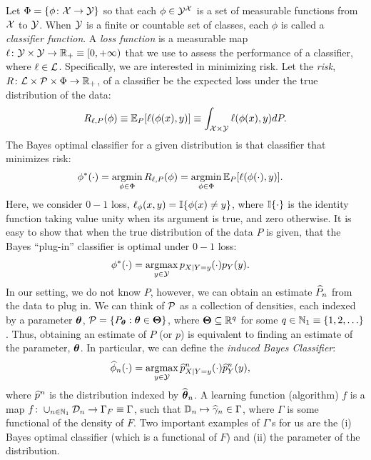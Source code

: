 \documentclass[10pt]{article}
\begin{document}
Let $\Phi=\{\phi {\ensuremath{\colon}} \mathcal{X} \to \mathcal{Y}\}$ so that each $\phi \in \mathcal{Y}^{\mathcal{X}}$ is a set of measurable functions from $\mathcal{X}$ to $\mathcal{Y}$. When $\mathcal{Y}$ is a finite or countable set of classes, each $\phi$ is called a \emph{classifier function}.  
A \emph{loss function} is a measurable map $\ell {\ensuremath{\colon}}  \mathcal{Y} \times \mathcal{Y} \to \mathbb{R}_+ \equiv [0,+\infty)$ that we use to assess the performance of a classifier, where $\ell \in \mathcal{L}$.  Specifically, we are interested in minimizing risk.
Let the \emph{risk}, $R {\colon} \mathcal{L} \times \mathcal{P} \times \Phi \to \mathbb{R}_+$, of a classifier be the expected loss under the true distribution of the data:
\begin{align}
	R_{\ell,P}(\phi) \equiv \mathbb{E}_P[\ell(\phi(x),y)] \equiv  \int_{\mathcal{X} \times \mathcal{Y}} \ell(\phi(x),y) dP.
\end{align}
The Bayes optimal classifier for a given distribution is that classifier that minimizes risk:
\begin{align}
	\phi^*(\cdot) &= \argmin_{\phi \in \Phi} R_{\ell,P}(\phi)= \argmin_{\phi \in \Phi} \EE_P[\ell(\phi(\cdot),y)].
\end{align}
Here, we consider $0-1$ loss, $\ell_\phi(x,y)=\mathbb{I}\{\phi(x) \neq y\}$, where $\mathbb{I}\{\cdot\}$ is the identity function taking value unity when its argument is true, and zero otherwise.  It is easy to show that when the true distribution of the data $P$  is given, that the Bayes ``plug-in'' classifier is optimal under $0-1$ loss:
\begin{align} 
	\phi^*(\cdot)&= \argmax_{y \in \mc{Y}} p_{X|Y=y}(\cdot) p_Y(y).
\end{align}
In our setting, we do not know $P$, however, we can obtain an estimate $\widehat{P}_n$ from the data to plug in.  We can think of $\mathcal{P}$ as a collection of densities, each indexed by a  parameter $\boldsymbol{\theta}$, $\mathcal{P}=\{P_{\boldsymbol{\theta}} : \boldsymbol{\theta} \in \boldsymbol{\Theta}\}$, where $\boldsymbol{\Theta} \subseteq \mathbb{R}^q$ for some $q \in \mathbb{N}_1 \equiv \{1,2,\ldots\}$. Thus, obtaining an estimate of $P$ (or $p$) is equivalent to finding an estimate of the parameter, $\boldsymbol{\theta}$.  In particular, we can define the \emph{induced Bayes Classifier}:
\begin{align} \label{eq:hbp}
	\wh{\phi}_n(\cdot)&= \argmax_{y \in \mc{Y}} \wh{p}^n_{X|Y=y}(\cdot) \wh{p}^n_Y(y),
\end{align}
where $\widehat{p}^n$ is the distribution indexed by $\widehat{\boldsymbol{\theta}}_n$.  A learning function (algorithm) $f$ is a map $f {\colon} \cup_{n \in \mathbb{N}_1} \mathcal{D}_n \to \Gamma_F \equiv \Gamma$, such that $\mathbb{D}_n \mapsto \widehat{\gamma}_n \in \Gamma$, where $\Gamma$ is some functional of the density of $F$.  Two important examples of $\Gamma$'s for us are the (i) Bayes optimal classifier (which is a functional of $F$) and (ii) the parameter of the distribution.   
\end{document}
